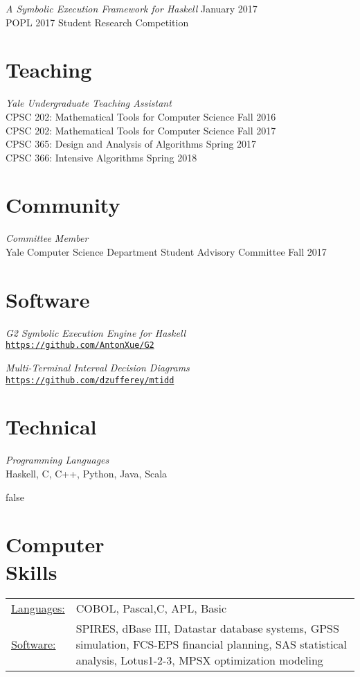 \documentclass[margin]{res}
\begin{document}
\begin{resume}
\textit{A Symbolic Execution Framework for Haskell}
  \hfill January 2017 \\
POPL 2017 Student Research Competition

\section{Teaching}
\textit{Yale Undergraduate Teaching Assistant} \\
  CPSC 202: Mathematical Tools for Computer Science
    \hfill Fall 2016 \\
  CPSC 202: Mathematical Tools for Computer Science
    \hfill Fall 2017 \\
  CPSC 365: Design and Analysis of Algorithms
    \hfill Spring 2017 \\
  CPSC 366: Intensive Algorithms
    \hfill Spring 2018

\section{Community}
\textit{Committee Member} \\
Yale Computer Science Department Student Advisory Committee
  \hfill Fall 2017

\section{Software}
\textit{G2 Symbolic Execution Engine for Haskell} \\
\href{https://github.com/AntonXue/G2}
     {\texttt{https://github.com/AntonXue/G2}}

\textit{Multi-Terminal Interval Decision Diagrams} \\
\href{https://github.com/dzufferey/mtidd}
     {\texttt{https://github.com/dzufferey/mtidd}}

\section{Technical}
\textit{Programming Languages} \\
Haskell, C, C++, Python, Java, Scala
 

\if false
\section{Computer \\ Skills}
   \begin{tabular}{l p{3in}}
    \underline{Languages:} & COBOL, Pascal,C, APL, Basic \\

     \underline{Software:} &  SPIRES, dBase III, Datastar database 
                        systems, GPSS simulation, FCS-EPS financial 
                        planning, SAS statistical analysis, 
                        Lotus1-2-3, MPSX optimization modeling 
   \end{tabular}
 \fi

\end{resume} 
\end{document}
